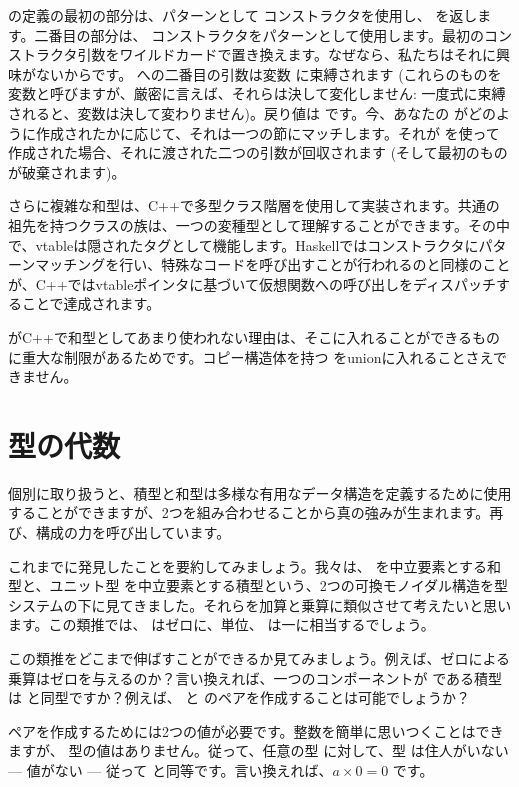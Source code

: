  の定義の最初の部分は、パターンとして  コンストラクタを使用し、 を返します。二番目の部分は、 コンストラクタをパターンとして使用します。最初のコンストラクタ引数をワイルドカードで置き換えます。なぜなら、私たちはそれに興味がないからです。  への二番目の引数は変数  に束縛されます (これらのものを変数と呼びますが、厳密に言えば、それらは決して変化しません: 一度式に束縛されると、変数は決して変わりません)。戻り値は  です。今、あなたの  がどのように作成されたかに応じて、それは一つの節にマッチします。それが  を使って作成された場合、それに渡された二つの引数が回収されます (そして最初のものが破棄されます)。

さらに複雑な和型は、C++で多型クラス階層を使用して実装されます。共通の祖先を持つクラスの族は、一つの変種型として理解することができます。その中で、vtableは隠されたタグとして機能します。Haskellではコンストラクタにパターンマッチングを行い、特殊なコードを呼び出すことが行われるのと同様のことが、C++ではvtableポインタに基づいて仮想関数への呼び出しをディスパッチすることで達成されます。

 がC++で和型としてあまり使われない理由は、そこに入れることができるものに重大な制限があるためです。コピー構造体を持つ  をunionに入れることさえできません。

\section{型の代数}

個別に取り扱うと、積型と和型は多様な有用なデータ構造を定義するために使用することができますが、2つを組み合わせることから真の強みが生まれます。再び、構成の力を呼び出しています。

これまでに発見したことを要約してみましょう。我々は、 を中立要素とする和型と、ユニット型 \code{()} を中立要素とする積型という、2つの可換モノイダル構造を型システムの下に見てきました。それらを加算と乗算に類似させて考えたいと思います。この類推では、 はゼロに、単位、\code{()} は一に相当するでしょう。

この類推をどこまで伸ばすことができるか見てみましょう。例えば、ゼロによる乗算はゼロを与えるのか？言い換えれば、一つのコンポーネントが  である積型は  と同型ですか？例えば、 と  のペアを作成することは可能でしょうか？

ペアを作成するためには2つの値が必要です。整数を簡単に思いつくことはできますが、  型の値はありません。従って、任意の型  に対して、型  は住人がいない --- 値がない --- 従って  と同等です。言い換えれば、$a \times 0 = 0$ です。

